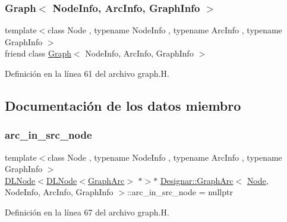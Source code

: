 \subsubsection{\texorpdfstring{Graph$<$ Node\+Info, Arc\+Info, Graph\+Info $>$}{Graph< NodeInfo, ArcInfo, GraphInfo >}}
{\footnotesize\ttfamily template$<$class Node , typename Node\+Info , typename Arc\+Info , typename Graph\+Info $>$ \\
friend class \hyperlink{class_designar_1_1_graph}{Graph}$<$ Node\+Info, Arc\+Info, Graph\+Info $>$\hspace{0.3cm}{\ttfamily [friend]}}



Definición en la línea 61 del archivo graph.\+H.



\subsection{Documentación de los datos miembro}
\mbox{\label{class_designar_1_1_graph_arc_addbd9ebec2787d3950aa679acf392fc6}} 
\subsubsection{\texorpdfstring{arc\+\_\+in\+\_\+src\+\_\+node}{arc\_in\_src\_node}}
{\footnotesize\ttfamily template$<$class Node , typename Node\+Info , typename Arc\+Info , typename Graph\+Info $>$ \\
\hyperlink{class_designar_1_1_d_l_node}{D\+L\+Node}$<$\hyperlink{class_designar_1_1_d_l_node}{D\+L\+Node}$<$\hyperlink{class_designar_1_1_graph_arc}{Graph\+Arc}$>$ $\ast$$>$$\ast$ \hyperlink{class_designar_1_1_graph_arc}{Designar\+::\+Graph\+Arc}$<$ \hyperlink{namespace_designar_a5af326c65aa2bd26b26c410f2030d09e}{Node}, Node\+Info, Arc\+Info, Graph\+Info $>$\+::arc\+\_\+in\+\_\+src\+\_\+node = nullptr\hspace{0.3cm}{\ttfamily [protected]}}



Definición en la línea 67 del archivo graph.\+H.

\mbox{\label{class_designar_1_1_graph_arc_a49385be5572e3c6dd2d22309ef5fd79a}} 
